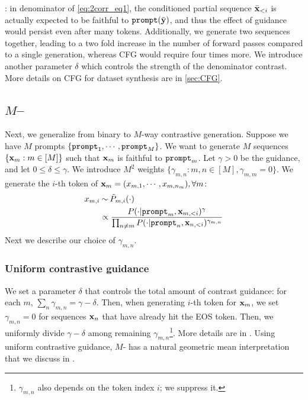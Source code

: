 : in denominator of \eqref{eq:2corr_eq1}, the conditioned partial sequence $\bar{\mathbf{x}}_{<i}$ is actually expected to be faithful to $\mathtt{prompt}(\bar{\mathbf{y}})$, and thus the effect of guidance would persist even after many tokens. Additionally, we generate two sequences together, leading to a two fold increase in the number of forward passes compared to a single generation, whereas CFG would require four times more. We introduce another parameter $\delta$ which controls the strength of the denominator contrast. More details on CFG for dataset synthesis are in \autoref{sec:CFG}. 


\subsection{$M$--\corrsyn}
\label{sec:M-corrsyn}
Next, we generalize from binary to $M$-way contrastive generation. Suppose we have $M$ prompts $\{\mathtt{prompt}_1,\cdots,\mathtt{prompt}_M\}$. We want to generate $M$ sequences $\{\mathbf{x}_m:m\in [M]\}$ such that $\mathbf{x}_m$ is faithful to $\mathtt{prompt}_m$. Let $\gamma>0$ be the guidance, and let $0\leq \delta\leq \gamma$. We introduce $M^2$ weights $\{\gamma_{m,n}:m,n\in[M], \gamma_{m,m}=0\}$. We generate the $i$-th token of $\mathbf{x}_m=(x_{m,1},\cdots,x_{m,n_m}), \forall m$:
\begin{align}
     x_{m,i}&\mathbin{\overset{}{\kern0pt\sim}}\tilde {P}_{m,i}(\cdot)\nonumber\\
    &\propto \frac{P(\cdot| \mathtt{prompt}_m,\mathbf{x}_{m,<i})^{\gamma}}{\prod_{n \neq m} P(\cdot| \mathtt{prompt}_n,\mathbf{x}_{n,<i})^{\gamma_{m,n}}}\label{eq:M-Corr-1}
\end{align}
Next we describe our choice of $\gamma_{m,n}$. 

\subsubsection{Uniform contrastive guidance}
\label{sec:unif_guidance}
We set a parameter $\delta$ that controls the total amount of contrast guidance: for each $m$, $\sum_n \gamma_{m,n}=\gamma-\delta$. Then, when generating $i$-th token for $\mathbf{x}_m$, we set $\gamma_{m,n}=0$ for sequences $\mathbf{x}_{n}$ that have already hit the EOS token. Then, we uniformly divide $\gamma-\delta$ among remaining $\gamma_{m,n}$\footnote{$\gamma_{m,n}$ also depends on the token index $i$; we suppress it.}. More details are in . Using uniform contrastive guidance, $M$-\corrsyn{} has a natural geometric mean interpretation that we discuss in . 



